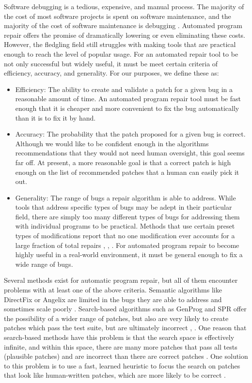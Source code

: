 \documentclass[conference]{IEEEtran}
\begin{document}
Software debugging is a tedious, expensive, and manual process. 
The majority of the cost of most software projects is spent on software maintenance, and the majority of the cost of software maintenance is debugging \cite{Genprog}. 
Automated program repair offers the promise of dramatically lowering or even eliminating these costs. 
However, the fledgling field still struggles with making tools that are practical enough to reach the level of popular usage. 
For an automated repair tool to be not only successful but widely useful, it must be meet certain criteria of efficiency, accuracy, and generality. For our purposes, we define these as:
\begin{itemize}
\item Efficiency: 
	The ability to create and validate a patch for a given bug in a reasonable amount of time. 
	An automated program repair tool must be fast enough that it is cheaper and more convenient to fix the bug automatically than it is to fix it by hand.
	
\item Accuracy: 
The probability that the patch proposed for a given bug is correct. 
Although we would like to be confident enough in the algorithms recommendations that they would not need human oversight, this goal seems far off. 
At present, a more reasonable goal is that a correct patch is high enough  on the list of recommended patches that a human can easily pick it out. 
\item Generality: 
The range of bugs a repair algorithm is able to address. 
While tools that address specific types of bugs may be adept in their particular field, there are simply too many different types of bugs for addressing them with individual programs to be practical. 
Methods that use certain preset types of modifications report that no one modification ever accounts for a large fraction of total repairs \cite{PAR}, \cite{hdrepair}, \cite{SPR}. 
For automated program repair to become highly useful in a real-world environment, it must be general enough to fix a wide range of bugs.
\end{itemize}


Several methods exist for automatic program repair, but all of them encounter problems with at least one of the above criteria. 
Semantic algorithms like DirectFix or Angelix are limited in the bugs they are able to address and sometimes scale poorly \cite{Angelix}. 
Search-based algorithms such as GenProg and SPR offer the possibility of a wider range of patches, but also are very likely to create patches which pass the test suite, but are ultimately incorrect \cite{Angelix}, \cite{SPR} \cite{Genprog}. One reason that search-based methods have this problem is that the search space is effectively infinite, and within this space, there are many more patches that pass all tests (plausible patches) and are incorrect than there are correct patches \cite{searchspace}. 
One solution to this problem is to use a fast, learned heuristic to focus the search on patches that look like human-written patches, which are more likely to be correct \cite{Prophet}. 
\end{document}
